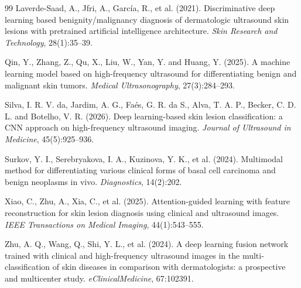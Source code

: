 \documentclass[12pt]{article}
\begin{document}
\begin{thebibliography}{99}
 Laverde-Saad, A., Jfri, A., Garc\'ia, R., et al. (2021). Discriminative deep learning based benignity/malignancy diagnosis of dermatologic ultrasound skin lesions with pretrained artificial intelligence architecture. \textit{Skin Research and Technology}, 28(1):35--39.

 Qin, Y., Zhang, Z., Qu, X., Liu, W., Yan, Y. and Huang, Y. (2025). A machine learning model based on high-frequency ultrasound for differentiating benign and malignant skin tumors. \textit{Medical Ultrasonography}, 27(3):284--293.

 Silva, I. R. V. da, Jardim, A. G., Fa\'es, G. R. da S., Alva, T. A. P., Becker, C. D. L. and Botelho, V. R. (2026). Deep learning-based skin lesion classification: a CNN approach on high-frequency ultrasound imaging. \textit{Journal of Ultrasound in Medicine}, 45(5):925--936.

 Surkov, Y. I., Serebryakova, I. A., Kuzinova, Y. K., et al. (2024). Multimodal method for differentiating various clinical forms of basal cell carcinoma and benign neoplasms in vivo. \textit{Diagnostics}, 14(2):202.

 Xiao, C., Zhu, A., Xia, C., et al. (2025). Attention-guided learning with feature reconstruction for skin lesion diagnosis using clinical and ultrasound images. \textit{IEEE Transactions on Medical Imaging}, 44(1):543--555.

 Zhu, A. Q., Wang, Q., Shi, Y. L., et al. (2024). A deep learning fusion network trained with clinical and high-frequency ultrasound images in the multi-classification of skin diseases in comparison with dermatologists: a prospective and multicenter study. \textit{eClinicalMedicine}, 67:102391.
\end{thebibliography}
\end{document}

